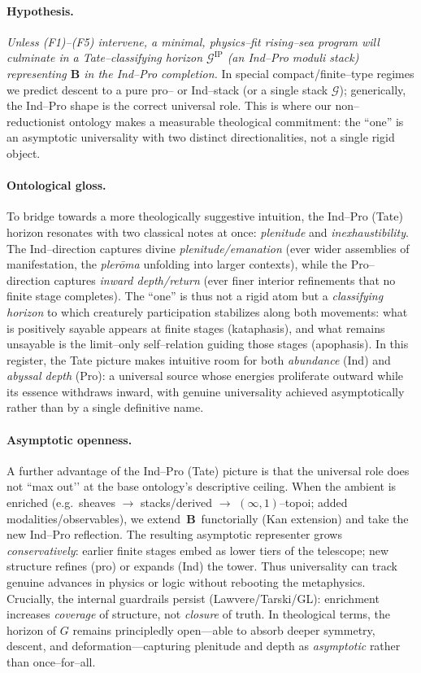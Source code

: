 \documentclass[11pt]{article}
\theoremstyle{upright}
\begin{document}
\paragraph{Hypothesis.}
\emph{Unless (F1)–(F5) intervene, a minimal, physics–fit rising–sea program will culminate in a Tate–classifying horizon \(\mathcal G^{\mathrm{IP}}\) (an Ind–Pro moduli stack) representing \(\mathbf B\) in the Ind–Pro completion.} In special compact/finite–type regimes we predict descent to a pure pro– or Ind–stack (or a single stack \(\mathcal G\)); generically, the Ind–Pro shape is the correct universal role. This is where our non–reductionist ontology makes a measurable theological commitment: the “one” is an asymptotic universality with two distinct directionalities, not a single rigid object.

\paragraph{Ontological gloss.}
To bridge towards a more theologically suggestive intuition, the Ind–Pro (Tate) horizon resonates with two classical notes at once: \emph{plenitude} and \emph{inexhaustibility}. The Ind–direction captures divine \emph{plenitude/emanation} (ever wider assemblies of manifestation, the \emph{plerōma} unfolding into larger contexts), while the Pro–direction captures \emph{inward depth/return} (ever finer interior refinements that no finite stage completes). The “one” is thus not a rigid atom but a \emph{classifying horizon} to which creaturely participation stabilizes along both movements: what is positively sayable appears at finite stages (kataphasis), and what remains unsayable is the limit–only self–relation guiding those stages (apophasis). In this register, the Tate picture makes intuitive room for both \emph{abundance} (Ind) and \emph{abyssal depth} (Pro): a universal source whose energies proliferate outward while its essence withdraws inward, with genuine universality achieved asymptotically rather than by a single definitive name.

\paragraph{Asymptotic openness.}
A further advantage of the Ind–Pro (Tate) picture is that the universal role does not “max out’’ at the base ontology’s descriptive ceiling. When the ambient is enriched (e.g.\ sheaves $\to$ stacks/derived $\to$ $(\infty,1)$–topoi; added modalities/observables), we extend $\,\mathbf B\,$ functorially (Kan extension) and take the new Ind–Pro reflection. The resulting asymptotic representer grows \emph{conservatively}: earlier finite stages embed as lower tiers of the telescope; new structure refines (pro) or expands (Ind) the tower. Thus universality can track genuine advances in physics or logic without rebooting the metaphysics. Crucially, the internal guardrails persist (Lawvere/Tarski/GL): enrichment increases \emph{coverage} of structure, not \emph{closure} of truth. In theological terms, the horizon of $G$ remains principledly open—able to absorb deeper symmetry, descent, and deformation—capturing plenitude and depth as \emph{asymptotic} rather than once–for–all.
\end{document}
